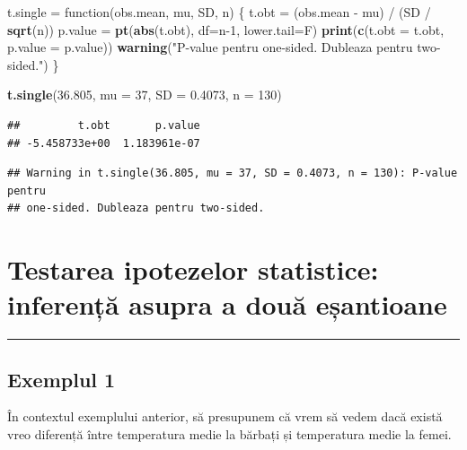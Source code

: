 \documentclass[]{article}
\newenvironment{Shaded}{\begin{snugshade}}{\end{snugshade}}
\newcommand{\KeywordTok}[1]{\textcolor[rgb]{0.13,0.29,0.53}{\textbf{{#1}}}}
\newcommand{\DataTypeTok}[1]{\textcolor[rgb]{0.13,0.29,0.53}{{#1}}}
\newcommand{\DecValTok}[1]{\textcolor[rgb]{0.00,0.00,0.81}{{#1}}}
\newcommand{\FloatTok}[1]{\textcolor[rgb]{0.00,0.00,0.81}{{#1}}}
\newcommand{\StringTok}[1]{\textcolor[rgb]{0.31,0.60,0.02}{{#1}}}
\newcommand{\NormalTok}[1]{{#1}}
\begin{document}
\begin{Shaded}
\begin{Highlighting}[]
\NormalTok{t.single =}\StringTok{ }\NormalTok{function(obs.mean, mu, SD, n) \{}
  \NormalTok{t.obt =}\StringTok{ }\NormalTok{(obs.mean -}\StringTok{ }\NormalTok{mu) /}\StringTok{ }\NormalTok{(SD /}\StringTok{ }\KeywordTok{sqrt}\NormalTok{(n))}
  \NormalTok{p.value =}\StringTok{ }\KeywordTok{pt}\NormalTok{(}\KeywordTok{abs}\NormalTok{(t.obt), }\DataTypeTok{df=}\NormalTok{n}\DecValTok{-1}\NormalTok{, }\DataTypeTok{lower.tail=}\NormalTok{F)}
  \KeywordTok{print}\NormalTok{(}\KeywordTok{c}\NormalTok{(}\DataTypeTok{t.obt =} \NormalTok{t.obt, }\DataTypeTok{p.value =} \NormalTok{p.value))}
  \KeywordTok{warning}\NormalTok{(}\StringTok{"P-value pentru one-sided. Dubleaza pentru two-sided."}\NormalTok{)}
\NormalTok{\}}

\KeywordTok{t.single}\NormalTok{(}\FloatTok{36.805}\NormalTok{, }\DataTypeTok{mu =} \DecValTok{37}\NormalTok{, }\DataTypeTok{SD =} \FloatTok{0.4073}\NormalTok{, }\DataTypeTok{n =} \DecValTok{130}\NormalTok{)}
\end{Highlighting}
\end{Shaded}

\begin{verbatim}
##         t.obt       p.value 
## -5.458733e+00  1.183961e-07
\end{verbatim}

\begin{verbatim}
## Warning in t.single(36.805, mu = 37, SD = 0.4073, n = 130): P-value pentru
## one-sided. Dubleaza pentru two-sided.
\end{verbatim}

\section{Testarea ipotezelor statistice: inferență asupra a două
eșantioane}\label{testarea-ipotezelor-statistice-inferenta-asupra-a-doua-esantioane}

\begin{center}\rule{0.5\linewidth}{\linethickness}\end{center}

\subsection{Exemplul 1}\label{exemplul-1-1}

În contextul exemplului anterior, să presupunem că vrem să vedem dacă
există vreo diferență între temperatura medie la bărbați și temperatura
medie la femei.
\end{document}
